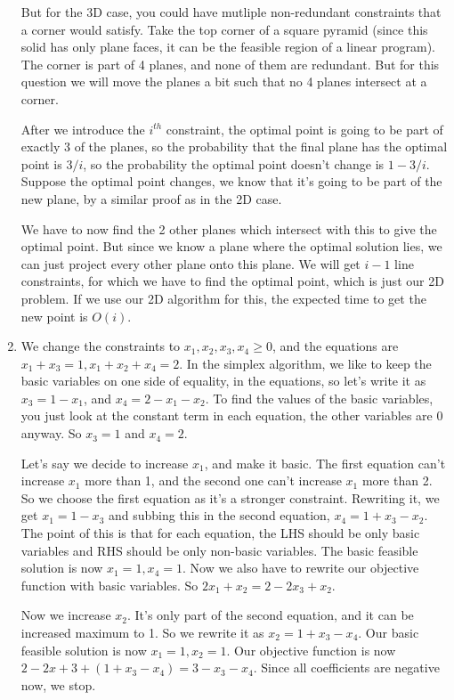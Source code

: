 \documentclass[12pt]{report}
\begin{document}
\begin{enumerate}[label=\textbf{\arabic*.}]
    But for the 3D case, you could have mutliple non-redundant constraints that a corner would satisfy. Take the top corner of a square 
    pyramid (since this solid has only plane faces, it can be the feasible region of a linear program). The corner is part of 4 planes, 
    and none of them are redundant. But for this question we will move the planes a bit such that no 4 planes intersect at a corner.

    After we introduce the $i^{th}$ constraint, the optimal point is going to be part of exactly 3 of the planes, so the probability that the final
    plane has the optimal point is $3/i$, so the probability the optimal point doesn't change is $1 - 3/i$. Suppose the optimal point 
    changes, we know that it's going to be part of the new plane, by a similar proof as in the 2D case.

    We have to now find the 2 other planes which intersect with this to give the optimal point. But since we know a plane where the
    optimal solution lies, we can just project every other plane onto this plane. We will get $i-1$ line constraints, for which we 
    have to find the optimal point, which is just our 2D problem. If we use our 2D algorithm for this, the expected time to get the 
    new point is $O(i)$.

    \item We change the constraints to $x_1, x_2, x_3, x_4 \geq 0$, and the equations are $x_1 + x_3 = 1, x_1 + x_2 + x_4 = 2$.
    In the simplex algorithm, we like to keep the basic variables on one side of equality, in the equations, so let's write it 
    as $x_3 = 1 - x_1$, and $x_4 = 2 - x_1 - x_2$. To find the values of the basic variables, you just look at the constant 
    term in each equation, the other variables are 0 anyway. So $x_3 = 1$ and $x_4 = 2$.

    Let's say we decide to increase $x_1$, and make it basic. The first equation can't increase $x_1$ more than 1, and the 
    second one can't increase $x_1$ more than 2. So we choose the first equation as it's a stronger constraint. Rewriting it,
    we get $x_1 = 1 - x_3$ and subbing this in the second equation, $x_4 = 1 + x_3 - x_2$. The point of this is that for each 
    equation, the LHS should be only basic variables and RHS should be only non-basic variables.
    The basic feasible solution is now $x_1 = 1, x_4 = 1$.
    Now we also have to rewrite our objective function with basic variables. So $2x_1 + x_2 = 2 - 2x_3 + x_2$. 

    Now we increase $x_2$. It's only part of the second equation, and it can be increased maximum to 1. So we rewrite it as 
    $x_2 = 1 + x_3 - x_4$. Our basic feasible solution is now $x_1 = 1, x_2 = 1$.
    Our objective function is now $2 - 2x+3 + (1 + x_3 - x_4) = 3 - x_3 - x_4$. Since all coefficients are negative now, we 
    stop.


\end{enumerate}
\end{document}
